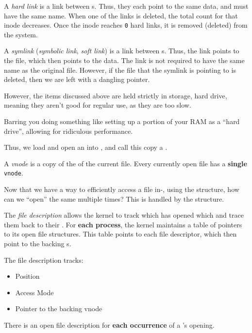 \begin{definition}\label{def:Hard_Link}
  A \emph{hard link} is a link between s.
  Thus, they each point to the same data, and must have the same name.
  When one of the links is deleted, the total count for that inode decreases.
  Once the inode reaches \texttt{0} hard links, it is removed (deleted) from the system.
\end{definition}

\begin{definition}[Symlink]\label{def:Symlink}\label{def:Symbolic_Link}\label{def:Soft_Link}
  A \emph{symlink} (\emph{symbolic link}, \emph{soft link}) is a link between s.
  Thus, the link points to the file, which then points to the data.
  The link is not required to have the same name as the original file.
  However, if the file that the symlink is pointing to is deleted, then we are left with a dangling pointer.
\end{definition}

However, the items discussed above are held strictly in storage, hard drive, meaning they aren't good for regular use, as they are too slow.
\begin{remark*}
  Barring you doing something like setting up a portion of your RAM as a ``hard drive'', allowing for ridiculous performance.
\end{remark*}

Thus, we load and open an  into , and call this copy a .

\begin{definition}\label{def:vnode}
  A \emph{vnode} is a copy of the  of the current file.
  Every currently open file has a \textbf{single} \texttt{vnode}.
\end{definition}

Now that we have a way to efficiently access a file in-, using the  structure, how can we ``open'' the same  multiple times?
This is handled by the  structure.

\begin{definition}\label{def:File_Description}
  The \emph{file description} allows the kernel to track which  has opened which  and trace them back to their .
  For \textbf{each process}, the kernel maintains a table of pointers to its open file structures.
  This table points to each file descriptor, which then point to the backing s.

  The file description tracks:
  \begin{itemize}[noitemsep]
  \item Position
  \item Access Mode
  \item Pointer to the backing vnode
  \end{itemize}

  There is an open file description for \textbf{each occurrence} of a 's opening.
\end{definition}

